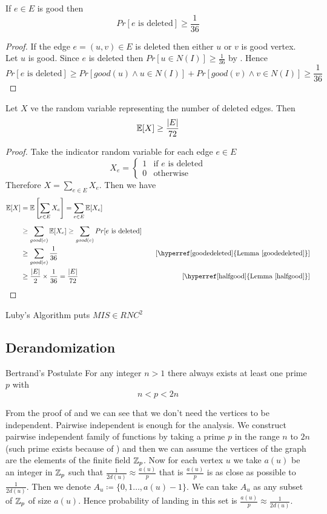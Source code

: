\begin{lemma}\label{goodedeleted}
	If $e\in E$ is good then $$Pr[\text{$e$ is deleted}]\geq \frac1{36}$$
\end{lemma}
\begin{proof}
	If the edge $e=(u,v)\in E$ is deleted then either $u$ or $v$ is good vertex. Let $u$ is good. Since $e$ is deleted then $Pr[u\in N(I)]\geq \frac1{36}$ by . Hence $$Pr[\text{$e$ is deleted}]\geq Pr[good(u)\wedge u\in N(I)] + Pr[good(v)\wedge v\in N(I)]\geq \frac1{36}$$
\end{proof}

\begin{lemma}\label{edgedeleted}
	Let $X$ ve the random variable representing the number of deleted edges. Then $$\mathbb{E}[X]\geq \frac{|E|}{72}$$
\end{lemma}
\begin{proof}
	Take the indicator random variable for each edge $e\in E$ $$X_e=\begin{cases}
		1& \text{if $e$ is deleted}\\ 0 &\text{otherwise}
	\end{cases}$$
	Therefore $X=\sum\limits_{e\in E}X_e$. Then we have \begin{align*}
		\bbE[X] & = \bbE\lt[ \sum_{e\in E}X_e \rt] = \sum_{e\in E}\bbE[X_e]\\[2mm]
		& \geq \sum_{good(e)}\bbE[X_e]\geq \sum_{good(e)}Pr[\text{$e$ is deleted}]\\ 
		& \geq \sum_{good(e)}\frac1{36} &\quad [\text{\hyperref[goodedeleted]{Lemma \ref{goodedeleted}}}]\\
		& \geq \frac{|E|}{2}\times \frac1{36}=\frac{|E|}{72}&\quad [\text{\hyperref[halfgood]{Lemma \ref{halfgood}}}]
	\end{align*}
\end{proof}

\begin{theorem}
	Luby's Algorithm puts $MIS\in RNC^2$
\end{theorem}
\subsection{Derandomization}
\begin{theorem}{Bertrand's Postulate}\label{bertrand}
	For any integer $n>1$ there always exists at least one prime $p$ with $$n<p<2n$$
\end{theorem}

From the proof of  and  we can see that we don't need the vertices to be independent. Pairwise independent is enough for the analysis. We construct pairwise independent family of functions by taking a prime $p$ in the range $n$ to $2n$ (such prime exists because of ) and then we can assume the vertices of the graph are the elements of the finite field $\mathbb{Z}_p$. Now for each vertex $u$ we take $a(u)$ be an integer in $\mathbb{Z}_p$ such that  $\frac1{2d(u)}\approx  \frac{a(u)}{p}$ that is $\frac{a(u)}{p}$ is as close as possible to $\frac1{2d(u)}$. Then we denote $A_u\coloneqq \{0,1\dots, a(u)-1\}$. We can take $A_u$ as any subset of $\mathbb{Z}_p$ of size $a(u)$.  Hence probability of landing in this set is $\frac{a(u)}{p}\approx \frac1{2d(u)}$.

